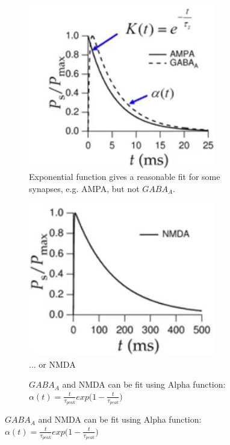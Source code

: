 \documentclass[]{article}
\begin{document}
\begin{figure}[H]
	\caption{What does $P_s$ look like over time, given a spike?}
	\begin{subfigure}[t]{0.45\textwidth}
		\caption{Exponential function gives a reasonable fit for some synapses, e.g. AMPA, but not $GABA_A$.}
		\includegraphics[width=0.9\textwidth]{PS1}
	\end{subfigure}
	\begin{subfigure}[t]{0.45\textwidth}
		\caption{... or NMDA}
		\includegraphics[width=0.9\textwidth]{PS2}
	\end{subfigure}
	\begin{subfigure}[t]{0.9\textwidth}
		\caption{$GABA_A$ and NMDA can be fit using Alpha function: $\alpha(t)=\frac{t}{\tau_{peak}} exp\big(1-\frac{t}{\tau_{peak}}\big)$}

\end{subfigure}
\end{figure}
\end{document}
